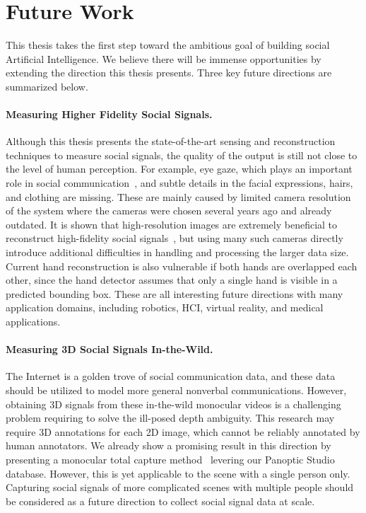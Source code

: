 \section{Future Work}
This thesis takes the first step toward the ambitious goal of building social Artificial Intelligence. We believe there will be immense opportunities by extending the direction this thesis presents. Three key future directions are summarized below.

\paragraph{Measuring Higher Fidelity Social Signals.}
Although this thesis presents the state-of-the-art sensing and reconstruction techniques to measure social signals, the quality of the output is still not close to the level of human perception. For example, eye gaze, which plays an important role in social communication~\cite{rayner1998eye,friesen1998eyes,ricciardelli2002my}, and subtle details in the facial expressions, hairs, and clothing are missing. These are mainly caused by limited camera resolution of the system where the cameras were chosen several years ago and already outdated. It is shown that high-resolution images are extremely beneficial to reconstruct high-fidelity social signals~\cite{beeler2010high,Beeler2011}, but using many such cameras directly introduce additional difficulties in handling and processing the larger data size. Current hand reconstruction is also vulnerable if both hands are overlapped each other, since the hand detector assumes that only a single hand is visible in a predicted bounding box. These are all interesting future directions with many application domains, including robotics, HCI, virtual reality, and medical applications.

\paragraph{Measuring 3D Social Signals In-the-Wild.}
The Internet is a golden trove of social communication data, and these data should be utilized to model more general nonverbal communications. However, obtaining 3D signals from these in-the-wild monocular videos is a challenging problem requiring to solve the ill-posed depth ambiguity. This research may require 3D annotations for each 2D image, which cannot be reliably annotated by human annotators. We already show a promising result in this direction by presenting a monocular total capture method~\cite{Xiang2019} levering our Panoptic Studio database. However, this is yet applicable to the scene with a single person only. Capturing social signals of more complicated scenes with multiple people should be considered as a future direction to collect social signal data at scale.

